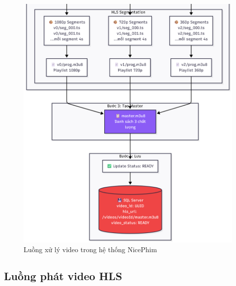 \begin{figure}[H]
	\centering
	\includegraphics[width=1\textwidth]{image/mermaid/luongxulyvideo2.png}
	\caption{Luồng xử lý video trong hệ thống NicePhim}
	\label{fig:luongxulyvideo2}
\end{figure}

\subsection{Luồng phát video HLS}


